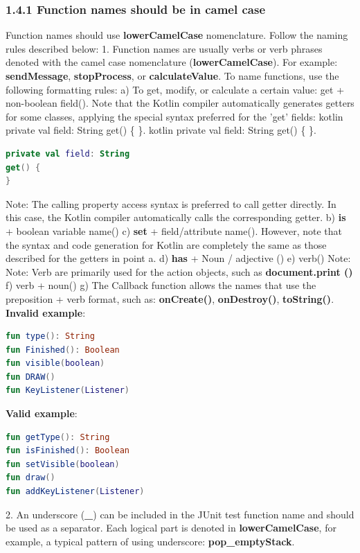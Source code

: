\subsubsection*{\textbf{1.4.1 Function names should be in camel case}}
\leavevmode\newline
\label{sec:1.4.1}
Function names should use \textbf{lowerCamelCase} nomenclature. Follow the naming rules described below:
1.	Function names are usually verbs or verb phrases denoted with the camel case nomenclature (\textbf{lowerCamelCase}).
For example: \textbf{sendMessage}, \textbf{stopProcess}, or \textbf{calculateValue}.
To name functions, use the following formatting rules:
a) To get, modify, or calculate a certain value: get + non-boolean field(). Note that the Kotlin compiler automatically generates getters for some classes, applying the special syntax preferred for the 'get' fields: kotlin private val field: String get() \{ \}. kotlin private val field: String get() \{ \}.
\begin{lstlisting}[language=Kotlin]
private val field: String
get() {
}
\end{lstlisting}
Note: The calling property access syntax is preferred to call getter directly. In this case, the Kotlin compiler automatically calls the corresponding getter.
b) \textbf{is} + boolean variable name()
c) \textbf{set} + field/attribute name(). However, note that the syntax and code generation for Kotlin are completely the same as those described for the getters in point a.
d) \textbf{has} + Noun / adjective ()
e) verb()
Note: Note: Verb are primarily used for the action objects, such as \textbf{document.print ()}
f) verb + noun() 
g) The Callback function allows the names that use the preposition + verb format, such as: \textbf{onCreate()}, \textbf{onDestroy()}, \textbf{toString()}.
\textbf{Invalid example}: 
\begin{lstlisting}[language=Kotlin]
fun type(): String
fun Finished(): Boolean
fun visible(boolean)
fun DRAW()
fun KeyListener(Listener)
\end{lstlisting}
\textbf{Valid example}: 
\begin{lstlisting}[language=Kotlin]
fun getType(): String
fun isFinished(): Boolean
fun setVisible(boolean)
fun draw()
fun addKeyListener(Listener)
\end{lstlisting}
2.	An underscore (\textbf{\_}) can be included in the JUnit test function name and should be used as a separator. Each logical part is denoted in \textbf{lowerCamelCase}, for example, a typical pattern of using underscore: \textbf{pop\_emptyStack}.
